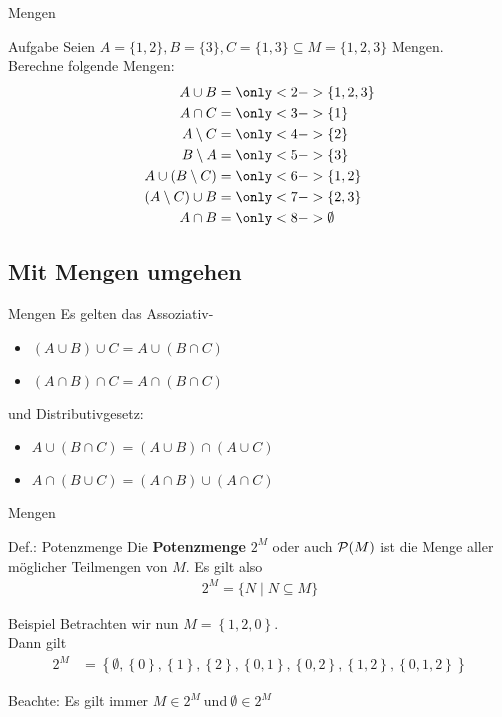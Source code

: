 	\begin{frame}{Mengen}
	\begin{exampleblock}{Aufgabe}
		Seien $A = \{1, 2\}, B = \{3\}, C = \{1, 3\}  \subseteq M = \{1, 2, 3\}$ Mengen.\\
		Berechne folgende Mengen:
		\begin{align*}
		A \cup B &= \only<2->{ \{1, 2, 3\} }  \\
		A \cap C &= \only<3->{ \{1\} }\\
		A \setminus C &= \only<4->{ \{2\} }\\
		B \setminus A &= \only<5->{ \{3\} }\\
		A \cup (B \setminus C) &= \only<6->{ \{1, 2\} }\\
		(A \setminus C) \cup B &= \only<7->{ \{2, 3\} }\\
		A \cap B &= \only<8->{ \emptyset }
		\end{align*}
	\end{exampleblock}
\end{frame}

\subsection{Mit Mengen umgehen}
	\begin{frame}{Mengen}
		Es gelten das Assoziativ- \\
			\begin{itemize}
				\item $(A\cup B) \cup C=A\cup(B\cap C)$
				\item $(A\cap B) \cap C=A\cap(B\cap C)$
			\end{itemize}
		und Distributivgesetz:\\
			\begin{itemize}
				\item $A\cup(B \cap C)=(A\cup B)\cap (A\cup C)$
				\item $A\cap(B \cup C)=(A\cap B)\cup (A\cap C)$
			\end{itemize}
	\end{frame}

	\begin{frame}{Mengen}
		\begin{block}{Def.: Potenzmenge}
		Die \textbf{Potenzmenge} $2^M$ oder auch $\mathcal{P} (M)$ ist die Menge aller möglicher Teilmengen von $M$. Es gilt also 
		\begin{align*}
			2^M = \{N \mid N \subseteq M\}
		\end{align*}
		\end{block}
		\pause
		\begin{exampleblock}{Beispiel}
		Betrachten wir nun   $M = \left\{ 1,2,0 \right\} $. \\
		Dann gilt 
		\begin{align*}
		2^M &= \left\{ \emptyset, \left\{ 0 \right\}, \left\{ 1 \right\}, \left\{ 2 \right\}, \left\{ 0,1 \right\} , \left\{ 0,2 \right\}, \left\{ 1,2 \right\}, \left\{ 0,1,2 \right\} \right\}
		\end{align*}
		
		Beachte: Es gilt immer $M \in 2^M \ \text{und} \ \emptyset \in 2^M$
		\end{exampleblock}
	\end{frame}

